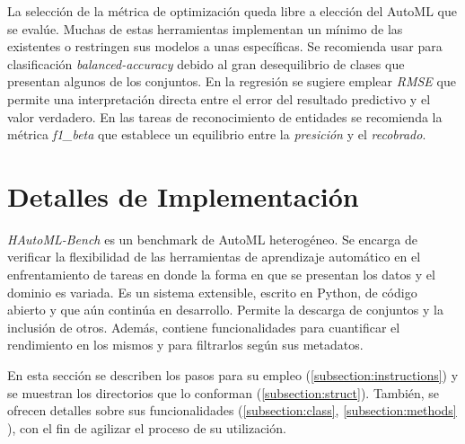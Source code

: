 La selección de la métrica de optimización queda libre a elección del AutoML que se evalúe. Muchas de estas herramientas implementan un mínimo de las existentes
o restringen sus modelos a unas específicas. Se recomienda usar para clasificación \textit{balanced-accuracy} debido al gran desequilibrio de clases que presentan 
algunos de los conjuntos. En la regresión se sugiere emplear \textit{RMSE} que permite una interpretación directa entre el error del resultado predictivo y el 
valor verdadero. En las tareas de reconocimiento de entidades se recomienda la métrica \textit{f1\_beta} que establece un equilibrio entre la \textit{presición} y el 
\textit{recobrado}.

\section{Detalles de Implementación}\label{section:Implementation}
\textit{HAutoML-Bench} es un benchmark de AutoML heterogéneo. Se encarga de verificar la flexibilidad de las herramientas de aprendizaje automático en el enfrentamiento
de tareas en donde la forma en que se presentan los datos y el dominio es variada. Es un sistema extensible, escrito en Python, de código abierto y que aún continúa en 
desarrollo. Permite la descarga de conjuntos y la inclusión de otros. Además, contiene funcionalidades para cuantificar el rendimiento en los mismos y para filtrarlos 
según sus metadatos. 

En esta sección se describen los pasos para su empleo (\ref{subsection:instructions}) y se muestran los directorios que lo conforman 
(\ref{subsection:struct}). También, se ofrecen detalles sobre sus funcionalidades (\ref{subsection:class}, \ref{subsection:methods} ),
con el fin de agilizar el proceso de su utilización.

